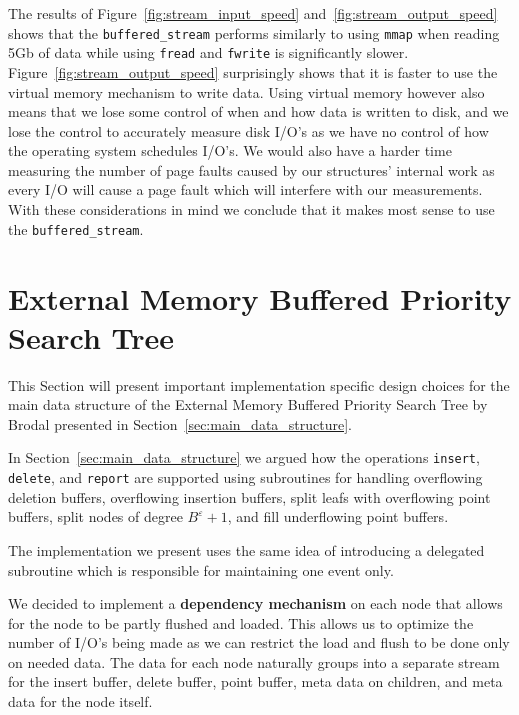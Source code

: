 \documentclass[twoside,11pt,openright]{report}
\def \epsilon {\varepsilon}
\begin{document}
The results of Figure~\ref{fig:stream_input_speed} and~\ref{fig:stream_output_speed} shows that the \texttt{buffered\_stream} performs similarly to using \texttt{mmap} when reading 5Gb of data while using \texttt{fread} and \texttt{fwrite} is significantly slower.
Figure~\ref{fig:stream_output_speed} surprisingly shows that it is faster to use the virtual memory mechanism to write data. Using virtual memory however also means that we lose some control of when and how data is written to disk, and we lose the control to accurately measure disk I/O's as we have no control of how the operating system schedules I/O's. We would also have a harder time measuring the number of page faults caused by our structures' internal work as every I/O will cause a page fault which will interfere with our measurements. With these considerations in mind we conclude that it makes most sense to use the \texttt{buffered\_stream}.

\section{External Memory Buffered Priority Search Tree}
\label{sec:impl_main_data_structure}
This Section will present important implementation specific design choices for the main data structure of the External Memory Buffered Priority Search Tree by Brodal presented in Section~\ref{sec:main_data_structure}.

In Section~\ref{sec:main_data_structure} we argued how the operations \texttt{insert}, \texttt{delete}, and \texttt{report} are supported using subroutines for handling overflowing deletion buffers, overflowing insertion buffers, split leafs with overflowing point buffers, split nodes of degree $B^\epsilon+1$, and fill underflowing point buffers.

The implementation we present uses the same idea of introducing a delegated subroutine which is responsible for maintaining one event only.

We decided to implement a \textbf{dependency mechanism} on each node that allows for the node to be partly flushed and loaded. This allows us to optimize the number of I/O's being made as we can restrict the load and flush to be done only on needed data. The data for each node naturally groups into a separate stream for the insert buffer, delete buffer, point buffer, meta data on children, and meta data for the node itself.
\end{document}
